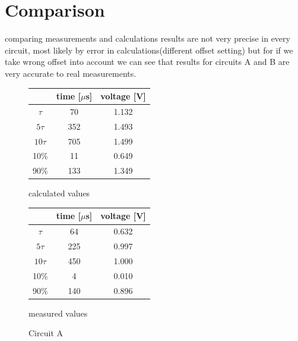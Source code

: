 \documentclass[notitlepage, a4paper, 11pt]{article}
\begin{document}
	\newpage
	\section{Comparison}
	
	comparing measurements and calculations results are not very precise in every circuit, most likely by error in calculations(different offset setting) but for if we take wrong offset into account we can see that results for circuits A and B are very accurate to real measurements.
	
	\begin{figure}[H]
		\centering
		\begin{subtable}{0.45\textwidth}
			\centering
			\begin{tabular}{|c|c|c|}
			\hline
			& time [$\mu$s] & voltage [V] \\
			\hline
			$\tau$ & 70 & 1.132 \\
			\hline		
			$5\tau$ & 352 & 1.493 \\
			\hline
			$10\tau$ & 705 & 1.499 \\
			\hline
			10\% & 11 & 0.649 \\
			\hline
			90\% & 133 & 1.349 \\
			\hline
			\end{tabular}
			\caption{calculated values}
		\end{subtable}
		\hfill
		\begin{subtable}{0.45\textwidth}
			\centering
			\begin{tabular}{|c|c|c|}
				\hline
				& time [$\mu$s] & voltage [V] \\
				\hline
				$\tau$ & 64 & 0.632 \\
				\hline		
				$5\tau$ & 225 & 0.997 \\
				\hline
				$10\tau$ & 450 & 1.000 \\
				\hline
				10\% & 4 & 0.010 \\
				\hline
				90\% & 140 & 0.896 \\
				\hline
			\end{tabular}
			\caption{measured values}
		\end{subtable}
		\caption{Circuit A}
	\end{figure}	
	
\end{document}
